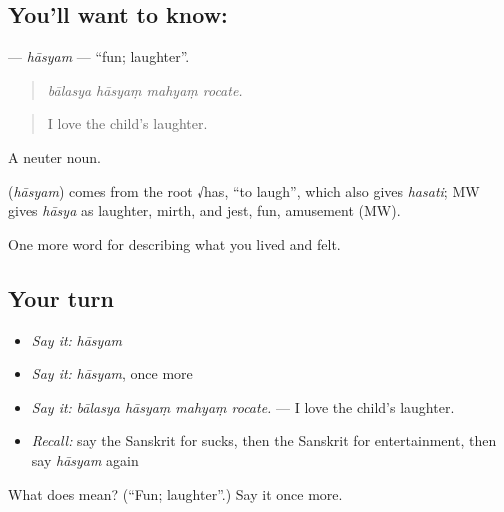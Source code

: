 \subsection*{You'll want to know: }
\textbf{} — \emph{hāsyam} — \textquotedblleft{}fun; laughter\textquotedblright{}.

\begin{quote}
   
\end{quote}

\begin{quote}
\emph{bālasya hāsyaṃ mahyaṃ rocate.}
\end{quote}

\begin{quote}
I love the child's laughter.
\end{quote}

A neuter noun.

\begin{cousinweb}
\textbf{} (\emph{hāsyam}) comes from the root √has, \textquotedblleft{}to laugh\textquotedblright{}, which also gives \emph{hasati}; MW gives \emph{hāsya} as laughter, mirth, and jest, fun, amusement (MW).
\end{cousinweb}

\begin{grammarlens}[title={What you've built}]
One more word for describing what you lived and felt.
\end{grammarlens}

\subsection*{Your turn}
\begin{itemize}
\raggedright
  \item \emph{Say it:} \emph{hāsyam}
  \item \emph{Say it:} \emph{hāsyam}, once more
  \item \emph{Say it:} \emph{bālasya hāsyaṃ mahyaṃ rocate.} — I love the child's laughter.
  \item \emph{Recall:} say the Sanskrit for sucks, then the Sanskrit for entertainment, then say \emph{hāsyam} again
\end{itemize}

\begin{tcolorbox}[breakable,colback=teal!4,colframe=teal!35!black,title={Before you move on}]
What does  mean? (\textquotedblleft{}Fun; laughter\textquotedblright{}.) Say it once more.
\end{tcolorbox}
